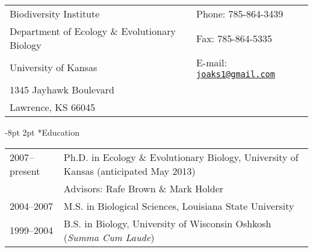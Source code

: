 \documentclass[10pt]{article}
\makeatletter
\renewcommand{\section}{\@startsection{section}{1}{0mm}%
    {-8pt}%
    {2pt}%
   {\bfseries\large}}
\makeatother
\begin{document}
\raggedright
\setlength{\parindent}{0in}
\singlespacing

\noindent\begin{tabular*}{\textwidth}[tb]{ @{}l @{\extracolsep{\fill}} l@{}}
Biodiversity Institute                                               & Phone: 785-864-3439 \\
Department of Ecology \& Evolutionary Biology     & Fax: 785-864-5335 \\
University of Kansas                                              & E-mail: \href{joaks1@gmail.com}{\tt joaks1@gmail.com} \\
1345 Jayhawk Boulevard                                       & \\
Lawrence, KS 66045                                              & \\
\end{tabular*}

\section*{Education}
\noindent\begin{tabulary}{\textwidth}{ @{} l L @{} }
2007--present	& Ph.D. in Ecology \& Evolutionary Biology, University of Kansas (anticipated May 2013) \\
			& \addtolength{\leftskip}{5mm}Advisors:  Rafe Brown \& Mark Holder \\
2004--2007	& M.S. in Biological Sciences, Louisiana State University \\
1999--2004	& B.S. in Biology, University of Wisconsin Oshkosh (\emph{Summa Cum Laude}) \\
\end{tabulary}
\end{document}
